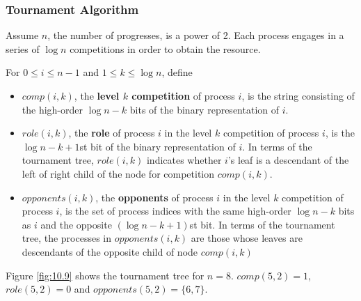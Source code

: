 \documentclass[11pt]{article}
\begin{document}
\subsubsection{Tournament Algorithm}
\label{sec:org36776e9}
Assume \(n\), the number of progresses, is a power of 2. Each process engages in a series of
\(\log n\) competitions in order to obtain the resource.

For \(0\le i\le n-1\) and \(1\le k\le\log n\), define
\begin{itemize}
\item \(comp(i,k)\), the \textbf{level \(k\) competition} of process \(i\), is the string consisting of the
high-order \(\log n-k\) bits of the binary representation of \(i\).
\item \(role(i,k)\), the \textbf{role} of process \(i\) in the level \(k\) competition of process \(i\), is the
\(\log n-k+1\)st bit of the binary representation of \(i\). In terms of the tournament tree,
\(role(i,k)\) indicates whether \(i\)'s leaf is a descendant of the left of right child of the node
for competition \(comp(i,k)\).
\item \(opponents(i,k)\), the \textbf{opponents} of process \(i\) in the level \(k\) competition of process \(i\),
is the set of process indices with the same high-order \(\log n-k\) bits as \(i\) and the opposite
\((\log n-k+1)\)st bit. In terms of the tournament tree, the processes in \(opponents(i,k)\) are
those whose leaves are descendants of the opposite child of node \(comp(i,k)\)
\end{itemize}

\begin{examplle}[]
Figure \ref{fig:10.9} shows the tournament tree for \(n=8\). \(comp(5,2)=1\), \(role(5,2)=0\) and \(opponents(5,2)=\{6,7\}\).
\end{examplle}
\end{document}
